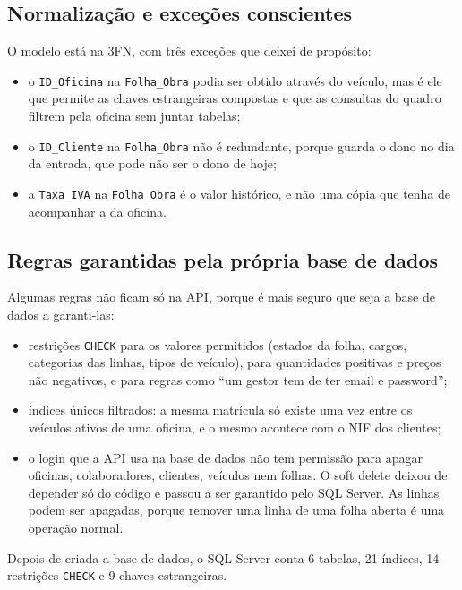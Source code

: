 \documentclass[a4paper,12pt]{article}
\begin{document}
\subsection{Normalização e exceções conscientes}

O modelo está na \ac{3FN}, com três exceções que deixei de propósito:
\begin{itemize}
    \item o \texttt{ID\_Oficina} na \texttt{Folha\_Obra} podia ser obtido através do veículo, mas é ele que permite as chaves estrangeiras compostas e que as consultas do quadro filtrem pela oficina sem juntar tabelas;
    \item o \texttt{ID\_Cliente} na \texttt{Folha\_Obra} não é redundante, porque guarda o dono no dia da entrada, que pode não ser o dono de hoje;
    \item a \texttt{Taxa\_IVA} na \texttt{Folha\_Obra} é o valor histórico, e não uma cópia que tenha de acompanhar a da oficina.
\end{itemize}

\subsection{Regras garantidas pela própria base de dados}

Algumas regras não ficam só na \ac{API}, porque é mais seguro que seja a base de dados a garanti-las:
\begin{itemize}
    \item restrições \texttt{CHECK} para os valores permitidos (estados da folha, cargos, categorias das linhas, tipos de veículo), para quantidades positivas e preços não negativos, e para regras como ``um gestor tem de ter email e password'';
    \item índices únicos filtrados: a mesma matrícula só existe uma vez entre os veículos ativos de uma oficina, e o mesmo acontece com o \ac{NIF} dos clientes;
    \item o login que a \ac{API} usa na base de dados não tem permissão para apagar oficinas, colaboradores, clientes, veículos nem folhas. O soft delete deixou de depender só do código e passou a ser garantido pelo SQL Server. As linhas podem ser apagadas, porque remover uma linha de uma folha aberta é uma operação normal.
\end{itemize}

Depois de criada a base de dados, o SQL Server conta 6 tabelas, 21 índices, 14 restrições \texttt{CHECK} e 9 chaves estrangeiras.
\end{document}

